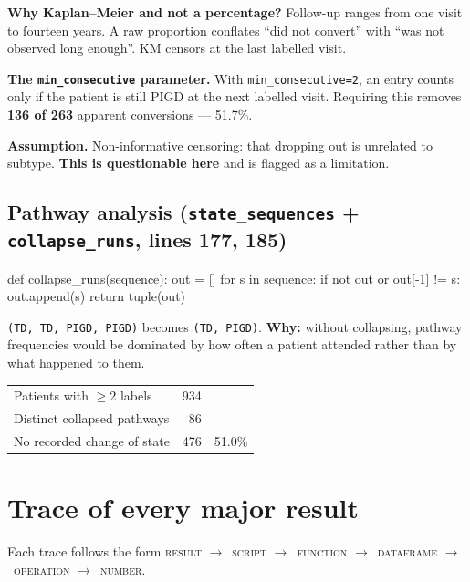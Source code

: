 \documentclass[11pt,a4paper]{article}
\newcommand{\code}[1]{\texttt{\small #1}}
\newcommand{\arr}{$\rightarrow$}
\begin{document}
\textbf{Why Kaplan--Meier and not a percentage?} Follow-up ranges from one
visit to fourteen years. A raw proportion conflates ``did not convert'' with
``was not observed long enough''. KM censors at the last labelled visit.

\textbf{The \code{min\_consecutive} parameter.} With
\code{min\_consecutive=2}, an entry counts only if the patient is still PIGD at
the next labelled visit. Requiring this removes \textbf{136 of 263} apparent
conversions --- 51.7\%.

\textbf{Assumption.} Non-informative censoring: that dropping out is unrelated
to subtype. \textbf{This is questionable here} and is flagged as a limitation.

\subsection{Pathway analysis \quad (\code{state\_sequences} + \code{collapse\_runs}, lines 177, 185)}

\begin{codeblock}
def collapse_runs(sequence):
    out = []
    for s in sequence:
        if not out or out[-1] != s:
            out.append(s)
    return tuple(out)
\end{codeblock}

\noindent
\code{(TD, TD, PIGD, PIGD)} becomes \code{(TD, PIGD)}. \textbf{Why:} without
collapsing, pathway frequencies would be dominated by how often a patient
attended rather than by what happened to them.

\begin{table}[h]
\centering
\begin{tabular}{@{}lrr@{}}
\toprule
Patients with $\geq 2$ labels & 934 & \\
Distinct collapsed pathways   & 86 & \\
No recorded change of state   & 476 & 51.0\% \\
\bottomrule
\end{tabular}
\end{table}

\section{Trace of every major result}

Each trace follows the form \textsc{result} \arr\ \textsc{script} \arr\
\textsc{function} \arr\ \textsc{dataframe} \arr\ \textsc{operation} \arr\
\textsc{number}.
\end{document}
